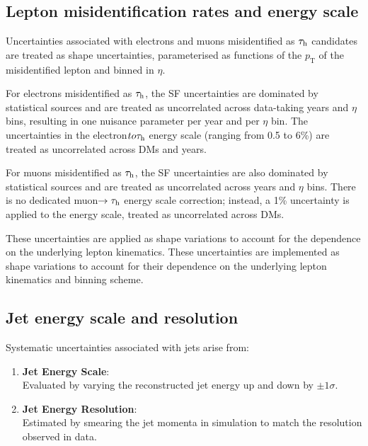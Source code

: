 \subsection{Lepton misidentification rates and energy scale}

Uncertainties associated with electrons and muons misidentified as $\tau_\mathrm{h}$ candidates are treated as shape uncertainties, parameterised as functions of the $p_{\text{T}}$ of the misidentified lepton and binned in $\eta$.

For electrons misidentified as $\tau_\mathrm{h}$, the \ac{SF} uncertainties are dominated by statistical sources and are treated as uncorrelated across data-taking years and $\eta$ bins, resulting in one nuisance parameter per year and per $\eta$ bin. The uncertainties in the electron$to\tau_\mathrm{h}$ energy scale (ranging from 0.5 to 6\%) are treated as uncorrelated across \acp{DM} and years.

For muons misidentified as $\tau_\mathrm{h}$, the \ac{SF} uncertainties are also dominated by statistical sources and are treated as uncorrelated across years and $\eta$ bins. There is no dedicated muon$\rightarrow\tau_\mathrm{h}$ energy scale correction; instead, a 1\% uncertainty is applied to the energy scale, treated as uncorrelated across DMs.

These uncertainties are applied as shape variations to account for the dependence on the underlying lepton kinematics. These uncertainties are implemented as shape variations to account for their dependence on the underlying lepton kinematics and binning scheme.

\subsection{Jet energy scale and resolution}

Systematic uncertainties associated with jets arise from:
\begin{enumerate}[label=(\roman*)]

\item \textbf{Jet Energy Scale}: \\
Evaluated by varying the reconstructed jet energy up and down by $\pm1\sigma$.

\item \textbf{Jet Energy Resolution}: \\
Estimated by smearing the jet momenta in simulation to match the resolution observed in data.

\end{enumerate}

